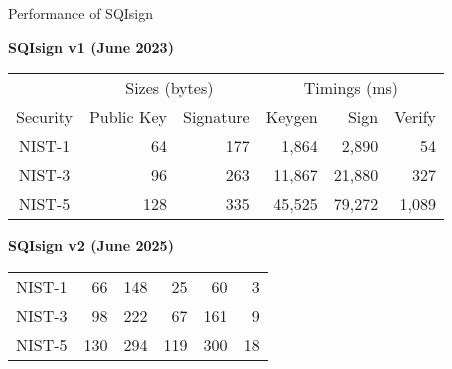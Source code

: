 \documentclass[aspectratio=169]{beamer}
\begin{document}
\begin{frame}{Performance of SQIsign}

  \centering

  \textbf{SQIsign v1 (June 2023)}
  \begin{table}[h]
    \centering
    \begin{tabular}{c r r r r r}
      \toprule
      & \multicolumn{2}{c}{Sizes (bytes)} & \multicolumn{3}{c}{Timings (ms)}\\
      \cmidrule(lr){2-3}\cmidrule(lr){4-6}
        Security & Public Key & Signature & Keygen & Sign & Verify \\
      \midrule
        NIST-1 &  64 & 177 &  1,864 &  2,890 &    54 \\
        NIST-3 &  96 & 263 & 11,867 & 21,880 &   327 \\
        NIST-5 & 128 & 335 & 45,525 & 79,272 & 1,089 \\
      \midrule
    \end{tabular}
  \end{table}

  \vspace{.5em}
  \textbf{SQIsign v2 (June 2025)}
  \begin{table}[h]
    \centering
    \begin{tabular}{c r r r r r}
      \phantom{Security} & \phantom{Public Key} & \phantom{Signature} & \phantom{Keygen} & \phantom{Sign} & \phantom{Verify} \\[-2em]
      \midrule
        NIST-1 &  66 & 148 &  25 &   60 &  3 \\
        NIST-3 &  98 & 222 &  67 &  161 &  9 \\
        NIST-5 & 130 & 294 & 119 &  300 & 18 \\
      \bottomrule
    \end{tabular}
  \end{table}
\end{frame}

\end{document}
